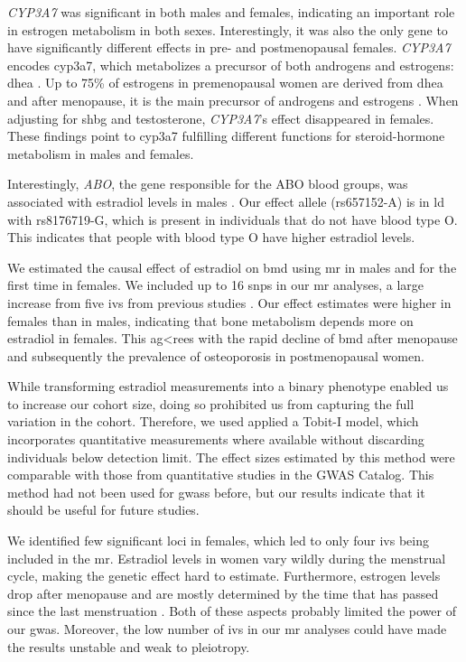 \documentclass[draft]{scrbook}
\begin{document}
\textit{CYP3A7} was significant in both males and females, indicating an important role in estrogen metabolism in both sexes.
Interestingly, it was also the only gene to have significantly different effects in pre- and postmenopausal females.
\textit{CYP3A7} encodes \gls{cyp3a7}, which metabolizes a precursor of both androgens and estrogens: \gls{dhea} \cite{Ohmori1998}.
Up to 75\% of estrogens in premenopausal women are derived from \gls{dhea} and after menopause, it is the main precursor of androgens and estrogens \cite{Simpson2001}.
When adjusting for \gls{shbg} and testosterone, \textit{CYP3A7}'s effect disappeared in females.
These findings point to \gls{cyp3a7} fulfilling different functions for steroid-hormone metabolism in males and females.

Interestingly, \textit{ABO}, the gene responsible for the ABO blood groups, was associated with estradiol levels in males \cite{Ogasawara1996}.
Our effect allele (rs657152-A) is in \gls{ld} with rs8176719-G, which is present in individuals that do not have blood type O.
This indicates that people with blood type O have higher estradiol levels.

We estimated the causal effect of estradiol on \gls{bmd} using \gls{mr} in males and for the first time in females.
We included up to 16 \glspl{snp} in our \gls{mr} analyses, a large increase from five \glspl{iv} from previous studies \cite{Nethander2018a}.
Our effect estimates were higher in females than in males, indicating that bone metabolism depends more on estradiol in females.
This ag<rees with the rapid decline of \gls{bmd} after menopause and subsequently the prevalence of osteoporosis in postmenopausal women.

While transforming estradiol measurements into a binary phenotype enabled us to increase our cohort size, doing so prohibited us from capturing the full variation in the cohort.
Therefore, we used applied a Tobit-I model, which incorporates quantitative measurements where available without discarding individuals below detection limit.
The effect sizes estimated by this method were comparable with those from quantitative studies in the GWAS Catalog.
This method had not been used for \glspl{gwas} before, but our results indicate that it should be useful for future studies.

We identified few significant loci in females, which led to only four \glspl{iv} being included in the \gls{mr}.
Estradiol levels in women vary wildly during the menstrual cycle, making the genetic effect hard to estimate.
Furthermore, estrogen levels drop after menopause and are mostly determined by the time that has passed since the last menstruation \cite{Richardson2020}.
Both of these aspects probably limited the power of our \gls{gwas}.
Moreover, the low number of \glspl{iv} in our \gls{mr} analyses could have made the results unstable and weak to pleiotropy.
\end{document}
